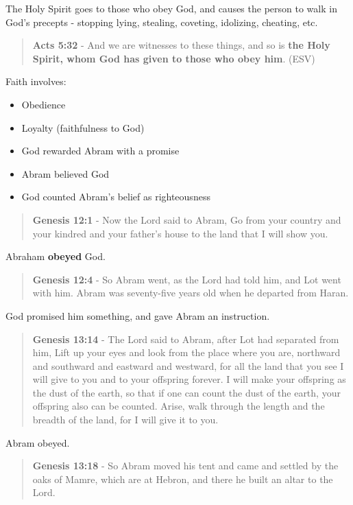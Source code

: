 \documentclass[11pt]{article}
\begin{document}
The Holy Spirit goes to those who obey God, and causes the person to walk in God's precepts - stopping lying, stealing, coveting, idolizing, cheating, etc.

\begin{quote}
\textbf{Acts 5:32} - And we are witnesses to these things, and so is \textbf{the Holy Spirit, whom God has given to those who obey him}. (ESV)
\end{quote}

Faith involves:
\begin{itemize}
\item Obedience
\item Loyalty (faithfulness to God)
\item God rewarded Abram with a promise
\item Abram believed God
\item God counted Abram's belief as righteousness
\end{itemize}

\begin{quote}
\textbf{Genesis 12:1} - Now the Lord said to Abram, Go from your country and your kindred and your father's house to the land that I will show you.
\end{quote}

Abraham \textbf{obeyed} God.

\begin{quote}
\textbf{Genesis 12:4} - So Abram went, as the Lord had told him, and Lot went with him. Abram was seventy-five years old when he departed from Haran.
\end{quote}

God promised him something, and gave Abram an instruction.

\begin{quote}
\textbf{Genesis 13:14} - The Lord said to Abram, after Lot had separated from him, Lift up your eyes and look from the place where you are, northward and southward and eastward and westward, for all the land that you see I will give to you and to your offspring forever. I will make your offspring as the dust of the earth, so that if one can count the dust of the earth, your offspring also can be counted. Arise, walk through the length and the breadth of the land, for I will give it to you.
\end{quote}

Abram obeyed.

\begin{quote}
\textbf{Genesis 13:18} - So Abram moved his tent and came and settled by the oaks of Mamre, which are at Hebron, and there he built an altar to the Lord.
\end{quote}
\end{document}
